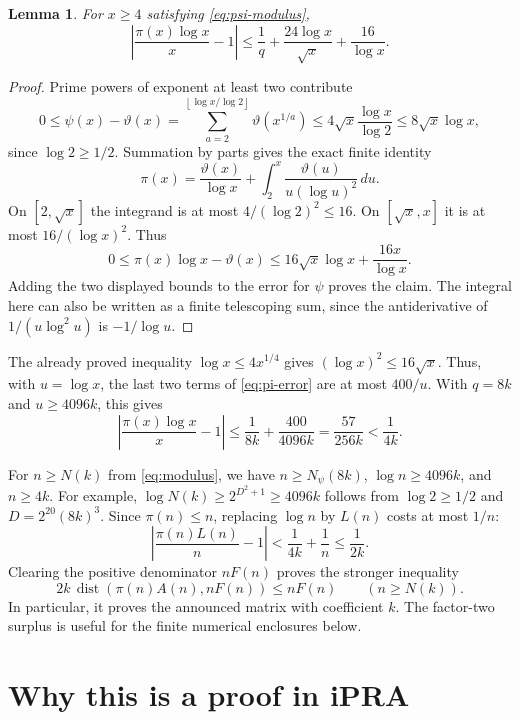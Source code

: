 \documentclass[11pt]{article}
\newtheorem{lemma}[theorem]{Lemma}
\theoremstyle{definition}
\theoremstyle{remark}
\newcommand{\abs}[1]{\left|#1\right|}
\newcommand{\floor}[1]{\left\lfloor#1\right\rfloor}
\newcommand{\dist}{\operatorname{dist}}
\begin{document}
\begin{lemma}\label{lem:pi-conversion}
For $x\ge4$ satisfying \eqref{eq:psi-modulus},
\begin{equation}\label{eq:pi-error}
 \abs{\frac{\pi(x)\log x}{x}-1}
 \le \frac1q+\frac{24\log x}{\sqrt{x}}+\frac{16}{\log x}.
\end{equation}
\end{lemma}
\begin{proof}
Prime powers of exponent at least two contribute
\[
 0\le\psi(x)-\vartheta(x)
 =\sum_{a=2}^{\floor{\log x/\log2}}\vartheta(x^{1/a})
 \le4\sqrt{x}\frac{\log x}{\log2}
 \le8\sqrt{x}\log x,
\]
since $\log2\ge1/2$. Summation by parts gives the exact finite identity
\[
 \pi(x)=\frac{\vartheta(x)}{\log x}
       +\int_2^x\frac{\vartheta(u)}{u(\log u)^2}\,du.
\]
On $[2,\sqrt{x}]$ the integrand is at most
$4/(\log2)^2\le16$. On $[\sqrt{x},x]$ it is at most
$16/(\log x)^2$. Thus
\[
 0\le\pi(x)\log x-\vartheta(x)
 \le16\sqrt{x}\log x+\frac{16x}{\log x}.
\]
Adding the two displayed bounds to the error for $\psi$ proves the claim.
The integral here can also be written as a finite telescoping sum, since
the antiderivative of $1/(u\log^2u)$ is $-1/\log u$.
\end{proof}

The already proved inequality $\log x\le4x^{1/4}$ gives
$(\log x)^2\le16\sqrt{x}$. Thus, with $u=\log x$, the last two terms
of \eqref{eq:pi-error} are at most $400/u$.
With $q=8k$ and $u\ge4096k$, this gives
\begin{equation}\label{eq:pi-quarter}
 \abs{\frac{\pi(x)\log x}{x}-1}
 \le\frac1{8k}+\frac{400}{4096k}
 =\frac{57}{256k}<\frac1{4k}.
\end{equation}

For $n\ge N(k)$ from \eqref{eq:modulus}, we have
$n\ge N_\psi(8k)$, $\log n\ge4096k$, and $n\ge4k$.
For example,
$\log N(k)\ge 2^{D^2+1}\ge4096k$ follows from
$\log2\ge1/2$ and $D=2^{20}(8k)^3$.
Since $\pi(n)\le n$, replacing $\log n$ by $L(n)$ costs at most $1/n$:
\begin{equation}\label{eq:rational-half}
 \abs{\frac{\pi(n)L(n)}n-1}
 <\frac1{4k}+\frac1n\le\frac1{2k}.
\end{equation}
Clearing the positive denominator $nF(n)$ proves the stronger inequality
\[
 2k\,\dist(\pi(n)A(n),nF(n))\le nF(n)
 \qquad(n\ge N(k)).
\]
In particular, it proves the announced matrix with coefficient $k$.
The factor-two surplus is useful for the finite numerical enclosures below.

\section{Why this is a proof in iPRA}\label{sec:arithmetic}
\end{document}
